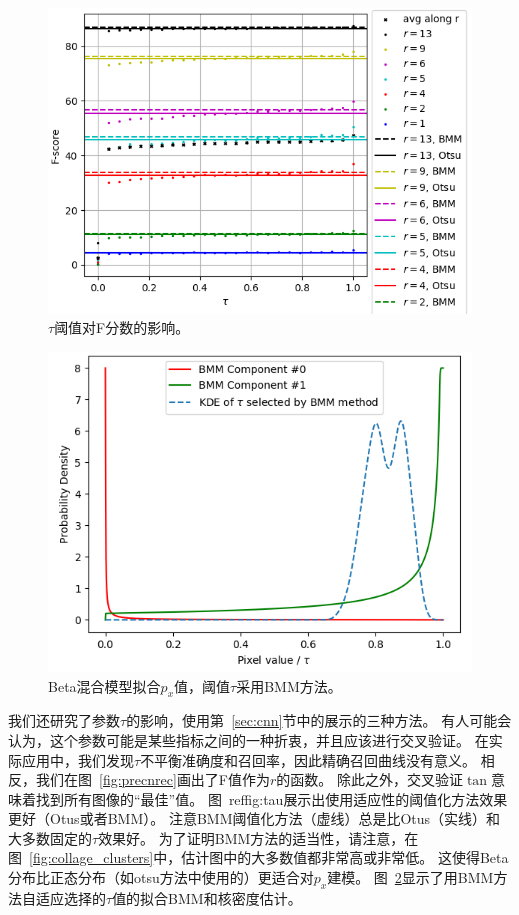 \documentclass[10pt,twocolumn,letterpaper,UTF8]{article}
\begin{document}
\begin{figure}[t]
\centering     %
\includegraphics[width=0.85\linewidth]{fig/threshold/fscore_vs_tau.png}
    \caption{
            $\tau$阈值对F分数的影响。}
    \label{fig:tau}
\end{figure}

\begin{figure}[t]
\centering     %
\includegraphics[width=0.85\linewidth]{fig/threshold/bmm_stats.png}
    \caption{
             Beta混合模型拟合$p_x$值，阈值$\tau$采用BMM方法。}
    \label{fig:bmm}
\end{figure}

我们还研究了参数$\tau$的影响，使用第~\ref{sec:cnn}节中的展示的三种方法。
有人可能会认为，这个参数可能是某些指标之间的一种折衷，并且应该进行交叉验证。
在实际应用中，我们发现$\tau$不平衡准确度和召回率，因此精确召回曲线没有意义。
相反，我们在图~\ref{fig:precnrec}画出了F值作为$r$的函数。
除此之外，交叉验证$\tan$意味着找到所有图像的“最佳”值。
图~ref{fig:tau}展示出使用适应性的阈值化方法效果更好（Otus或者BMM）。
注意BMM阈值化方法（虚线）总是比Otus（实线）和大多数固定的$\tau$效果好。
为了证明BMM方法的适当性，请注意，在图~\ref{fig:collage_clusters}中，估计图中的大多数值都非常高或非常低。
这使得Beta分布比正态分布（如otsu方法中使用的）更适合对$p_x$建模。
图~\ref{fig:bmm}显示了用BMM方法自适应选择的$\tau$值的拟合BMM和核密度估计。
\end{document}
